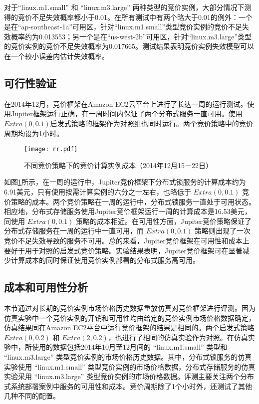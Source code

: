 对于``linux.m1.small'' 和 ``linux.m3.large'' 两种类型的竞价实例，大部分情况下测得的竞价不足失效概率都小于0.01。在所有测试中有两个略大于0.01的例外：一个是在``ap-southeast-1a''可用区，针对``linux.m1.small''类型竞价实例的竞价不足失效概率约为0.013553；另一个是在``us-west-2b''可用区，针对``linux.m3.large''类型的竞价实例的竞价不足失效概率为0.017665。测试结果表明竞价实例失效模型可以在一个较小误差内估计失效概率。

\subsection{可行性验证}
在2014年12月，竞价框架在Amazon EC2云平台上进行了长达一周的运行测试。使用Jupiter框架运行正确，在一周时间内保证了两个分布式服务一直可用。使用$Extra(0, 0.1)$启发式策略的框架作为对照组也同时运行。两个竞价策略中的竞价周期均设为1小时。
\begin{figure}
  \centering
  \texttt{[image: rr.pdf]}
  \caption{不同竞价策略下的竞价计算实例成本（2014年12月15－22日）}
  \label{figure:rr}
\end{figure}

如图\ref{figure:rr}所示，在一周的运行中，Jupiter竞价框架下分布式锁服务的计算成本约为6.91美元，只有使用按需计算实例的六分之一左右，也略低于 $Extra(0, 0.1)$ 竞价策略的成本。两个竞价策略在一周的运行中，分布式锁服务一直处于可用状态。相应地，分布式存储服务使用Jupiter竞价框架运行一周的计算成本是16.53美元，同使用 $Extra(0, 0.1)$ 策略的成本相近。在可用性方面，Jupiter竞价策略保证了分布式存储服务在一周的运行中一直可用，而 $Extra(0, 0.1)$ 策略则出现了一次竞价不足失效导致的服务不可用。总的来看，Jupiter竞价框架在可用性和成本上要好于用于对照的启发式竞价策略。实验结果表明，Jupiter竞价框架可在显著减少计算成本的同时保证使用竞价实例部署的分布式服务高可用。

\subsection{成本和可用性分析}
\label{subsec:ca}
本节通过对长期的竞价实例市场价格历史数据重放仿真对竞价框架进行评测。因为仿真实验中一个竞价实例的开销和可用性均由给定的竞价实例市场价格数据确定，仿真结果同在Amazon EC2平台中运行竞价框架的结果是相同的。两个启发式策略 $Extra(0, 0.2)$ 和 $Extra(2, 0.2)$，也进行了相同的仿真实验作为对照。在仿真实验中，所使用的数据包括2014年10月至12月间的 ``linux.m1.small'' 类型和 ``linux.m3.large'' 类型竞价实例的市场价格历史数据。其中，分布式锁服务的仿真实验使用 ``linux.m1.small'' 类型竞价实例的市场价格数据，分布式存储服务的仿真实验采用 ``linux.m3.large'' 类型竞价实例的市场价格数据。评测主要关注两个分布式系统部署案例中服务的可用性和成本。竞价周期除了1个小时外，还测试了其他几种不同的配置。

